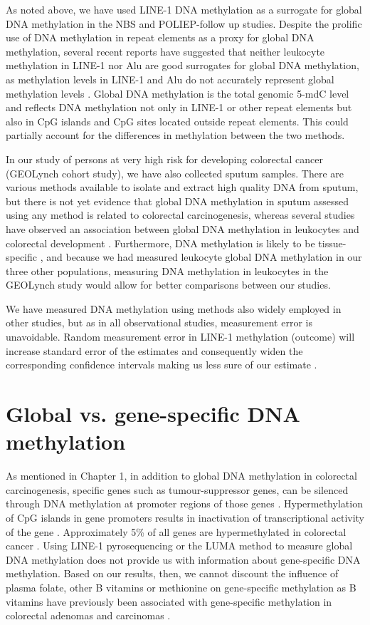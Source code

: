 \noindent As noted above, we have used LINE-1 DNA methylation as a surrogate for global DNA methylation in the NBS and POLIEP-follow up studies. Despite the prolific use of DNA methylation in repeat elements as a proxy for global DNA methylation, several recent reports have suggested that neither leukocyte methylation in LINE-1 nor Alu are good surrogates for global DNA methylation, as methylation levels in LINE-1 and Alu do not accurately represent global methylation levels \cite{c734,c753}. Global DNA methylation is the total genomic 5-mdC level and reflects DNA methylation not only in LINE-1 or other repeat elements but also in CpG islands and CpG sites located outside repeat elements. This could partially account for the differences in methylation between the two methods. 
 
\noindent In our study of persons at very high risk for developing colorectal cancer (GEOLynch cohort study), we have also collected sputum samples. There are various methods available to isolate and extract high quality DNA from sputum, but there is not yet evidence that global DNA methylation in sputum assessed using any method is related to colorectal carcinogenesis, whereas several studies have observed an association between global DNA methylation in leukocytes and colorectal development \cite{c754}. Furthermore, DNA methylation is likely to be tissue-specific \cite{c734,c755}, and because we had measured leukocyte global DNA methylation in our three other populations, measuring DNA methylation in leukocytes in the GEOLynch study would allow for better comparisons between our studies. 
 
\noindent We have measured DNA methylation using methods also widely employed in other studies, but as in all observational studies, measurement error is unavoidable. Random measurement error in LINE-1 methylation (outcome) will increase standard error of the estimates and consequently widen the corresponding confidence intervals making us less sure of our estimate \cite{c743,c744}. 
 
\section[]{Global vs. gene-specific DNA methylation} %
\noindent As mentioned in Chapter 1, in addition to global DNA methylation in colorectal carcinogenesis, specific genes such as tumour-suppressor genes, can be silenced through DNA methylation at promoter regions of those genes \cite{c756,c757}. Hypermethylation of CpG islands in gene promoters results in inactivation of transcriptional activity of the gene \cite{c758}. Approximately 5\% of all genes are hypermethylated in colorectal cancer \cite{c759}. Using LINE-1 pyrosequencing or the LUMA method to measure global DNA methylation does not provide us with information about gene-specific DNA methylation. Based on our results, then, we cannot discount the influence of plasma folate, other B vitamins or methionine on gene-specific methylation as B vitamins have previously been associated with gene-specific methylation in colorectal adenomas \cite{c760} and carcinomas \cite{c761}. 
 
